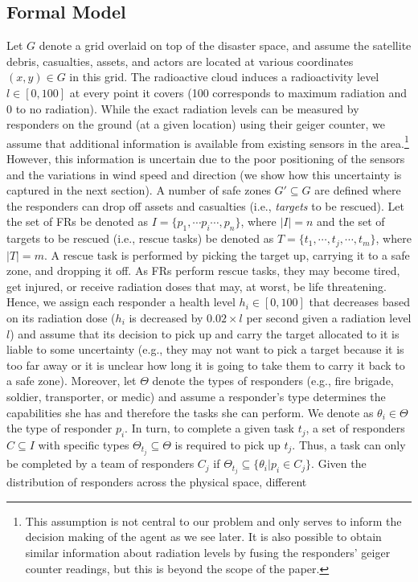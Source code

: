 
\subsection{Formal Model}\label{sec:model}
\noindent Let $G$ denote a grid overlaid on top of the disaster space, and assume the satellite debris, casualties, assets, and actors are located at various coordinates $(x,y) \in G$ in this grid. The radioactive cloud induces a radioactivity level  $l \in [0,100]$ at every point it covers (100 corresponds to maximum radiation and 0 to no radiation). While the exact radiation levels can be measured by responders on the ground (at a given location) using their geiger counter, we assume that additional information is available  from existing sensors  in the area.\footnote{This assumption is not central to our problem and only serves to inform the decision making of the agent as we see later. It is also possible to obtain similar information about radiation levels by fusing the responders' geiger counter readings, but this is beyond the scope of the paper.} However, this information is uncertain due to the poor positioning of the sensors and the variations in wind speed and direction (we show how this uncertainty is captured in the next section). A number of safe zones $G' \subseteq G$ are defined where the responders can drop off assets and casualties (i.e., \emph{targets} to be rescued). Let the set of FRs be denoted as $I = \{p_1, \cdots p_i \cdots, p_n\}$, where $|I| = n$ and the set of  targets to be rescued (i.e., rescue tasks) be denoted as  $T = \{t_1,\cdots, t_j, \cdots, t_m\}$, where $|T| = m$. A rescue task is performed by picking the target up, carrying it to a safe zone, and dropping it off.  As FRs perform rescue tasks, they may become tired, get injured, or receive radiation doses that may, at worst, be life threatening. Hence, we assign each responder  a health level $h_i\in [0,100]$ that decreases based on its radiation dose ($h_i$ is decreased by $0.02 \times l$ per second given a radiation level $l$) and assume that its decision to pick up and carry the target allocated to it is liable to some uncertainty (e.g., they may not want to pick a target because it is too far away or it is unclear how long it is going to take them to  carry it back  to a safe zone).  Moreover, let $\Theta$ denote the types of responders (e.g., fire brigade, soldier, transporter, or medic)  and assume a responder's type determines the capabilities  she has and therefore the tasks  she can perform. We denote as $\theta_i \in \Theta$ the type of responder $p_i$. In turn, to complete a given task $t_j$,  a set of responders $C \subseteq I$ with specific types $\Theta_{t_j} \subseteq \Theta$ is required to pick up $t_j$. Thus, a task can only be completed by a team of responders $C_j$ if $  \Theta_{t_j} \subseteq \{\theta_i | p_i \in C_j\}$. Given the distribution of responders across the physical space, different 